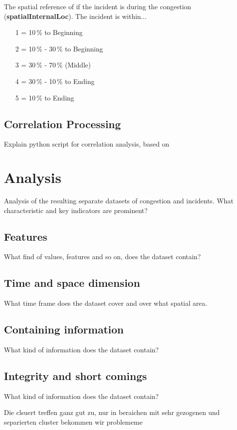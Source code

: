\documentclass[a4paper,headsepline,footsepline,fontsize=11pt,BCOR=12mm,DIV=12]{report}
\begin{document}
The spatial reference of if the incident is during the congestion (\textbf{spatialInternalLoc}). The incident is within...
\begin{itemize}
	\setlength\itemsep{0em}
	\item[1] = 10\,\% to Beginning
	\item[2] = 10\,\% - 30\,\% to Beginning
	\item[3] = 30\,\% - 70\,\% (Middle)
	\item[4] = 30\,\% - 10\,\% to Ending
	\item[5] = 10\,\% to Ending
\end{itemize}
    
    
\section{Correlation Processing}
\label{definition_correlation_processing}

Explain python script for correlation analysis, based on \cite{Potvin2020}

\chapter{Analysis}

Analysis of the resulting separate datasets of congestion and incidents. What characteristic and key indicators are prominent?
\section{Features}
What find of values, features and so on, does the dataset contain?
\section{Time and space dimension}
What time frame does the dataset cover and over what spatial area.
\section{Containing information}
What kind of information does the dataset contain?
\section{Integrity and short comings}
What kind of information does the dataset contain?


Die clsuert treffen ganz gut zu, nur in beraichen mit sehr gezogenen und separierten cluster bekommen wir problememe
\end{document}
